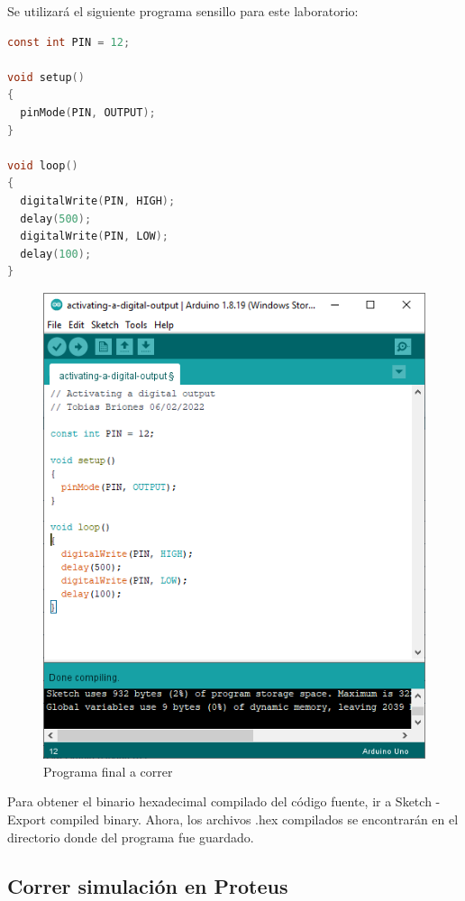 \documentclass{article}
\begin{document}
\bigbreak

Se utilizará el siguiente programa sensillo para este laboratorio:

\begin{lstlisting}[language=C, caption=Programa para activar una salida digital]
const int PIN = 12;

void setup()
{
  pinMode(PIN, OUTPUT);
}

void loop()
{
  digitalWrite(PIN, HIGH);
  delay(500);
  digitalWrite(PIN, LOW);
  delay(100);
}
\end{lstlisting}

\begin{figure}[H]
    \centering
    \includegraphics[width=0.3\paperwidth]{images/arduino-2.png}
    \caption{Programa final a correr}
\end{figure}

Para obtener el binario hexadecimal compilado del código fuente, ir a Sketch - Export compiled binary.
Ahora, los archivos .hex compilados se encontrarán en el directorio donde del programa fue guardado.

\subsection{Correr simulación en Proteus}
\end{document}
